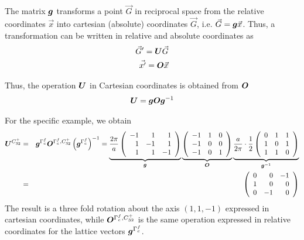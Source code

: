 \documentclass[11pt,a4paper]{report}
\begin{document}
The matrix $\bm{g}$ transforms a point $\vec{G}$ in reciprocal space
from the relative coordinates $\vec{x}$ into cartesian (absolute)
coordinates $\vec{G}$, i.e. $\vec{G}=\bm{g}\vec{x}$.  Thus, a
transformation can be written in relative and absolute coordinates as
\begin{eqnarray}
\vec{G}'=\bm{U}\vec{G}
\nonumber\\
\vec{x'}=\bm{O}\vec{x}
\end{eqnarray}

Thus, the operation $\bm{U}$ in Cartesian coordinates is obtained from
$\bm{O}$
\begin{eqnarray*}
\bm{U}=\bm{g}\bm{O}\bm{g}^{-1}
\end{eqnarray*}

For the specific example, we obtain
\begin{eqnarray}
\bm{U}^{C^+_{32}}&=&\bm{g}^{\Gamma^f_c}\bm{O}^{\Gamma^f_c,C^+_{32}}
\left(\bm{g}^{\Gamma^f_c}\right)^{-1}
=
\underbrace{\frac{2\pi}{a}\left(\begin{array}{rrr}
-1 & 1& 1\\
 1 & -1& 1\\
 1 & 1& -1 \\
\end{array}\right)}_{\bm{g}}
\underbrace{\left(\begin{array}{ccc}
-1 & 1 & 0 \\
-1 & 0 & 0 \\
-1 & 0 & 1\\
\end{array}\right)}_{\bm{O}}
\underbrace{\frac{a}{2\pi}\cdot\frac{1}{2}
\left(\begin{array}{rrr}
0 & 1& 1\\
 1 & 0& 1\\
 1 & 1& 0 \\
\end{array}\right)}_{\bm{g}^{-1}}
\nonumber\\
&=&\left(\begin{array}{rrr}
 0 &  0& -1\\
 1 &  0&  0\\
 0 & -1&  0 \\
\end{array}\right)
\end{eqnarray}
The result is a three fold rotation about the axis $(1,1,-1)$
expressed in cartesian coordinates, while
$\bm{O}^{\Gamma^f_c,C^+_{32}}$ is the same operation expressed in
relative coordinates for the lattice vectors $\bm{g}^{\Gamma^f_c}$.
\end{document}
